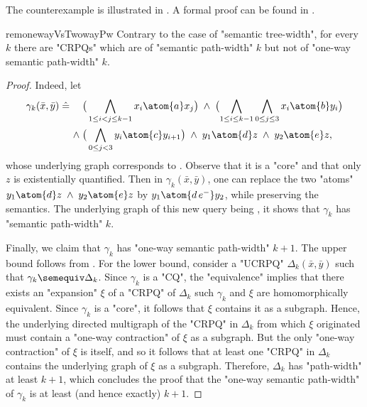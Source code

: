 The counterexample is illustrated in . A formal proof can be found
in .
\begin{restatable}{rem}{onewayVsTwowayPw}
	\AP\label{rk:path-width:oneway-vs-twoway}
	Contrary to the case of "semantic tree-width", for every $k$ there are "CRPQs" which are of "semantic path-width" $k$ but not of "one-way semantic path-width" $k$.
\end{restatable}
\begin{proof}
	Indeed, let
	\begin{align*}
		\gamma_k(\bar x, \bar y) \defeq\hspace{1em}
		\bigl( & \bigwedge_{1 \leq i < j \leq k-1} x_i \atom{a} x_j \bigr)
		\;\land\; \bigl(\bigwedge_{1 \leq i \leq k-1} \bigwedge_{0 \leq j \leq 3} x_i \atom{b} y_i \bigr) \\
		\land\; \bigl( & \bigwedge_{0 \leq j < 3} y_i \atom{c} y_{i+1}\bigr)
		\;\land\; y_1 \atom{d} z \;\land\; y_2 \atom{e} z,
	\end{align*}
	whose underlying graph corresponds to .
	Observe that it is a "core" and that only $z$ is existentially quantified.
	Then in $\gamma_k(\bar x, \bar y)$, one can replace the two "atoms"
	$y_1 \atom{d} z \;\land\; y_2 \atom{e} z$ by $y_1 \atom{d\, e^{-}} y_2$, while preserving the semantics. The underlying graph of this new query being , it shows that $\gamma_k$ has "semantic path-width" $k$.

	Finally, we claim that $\gamma_k$ has "one-way semantic path-width" $k+1$.
	The upper bound follows from .
	For the lower bound, consider a "UCRPQ" $\Delta_k(\bar x, \bar y)$ such that
	$\gamma_k \semequiv \Delta_k$. Since $\gamma_k$ is a "CQ", the "equivalence" implies
	that there exists an "expansion" $\xi$ of a "CRPQ" of $\Delta_k$ such $\gamma_k$ and
	$\xi$ are homomorphically equivalent. Since $\gamma_k$ is a "core", it follows that
	$\xi$ contains it as a subgraph. Hence, the underlying directed multigraph
	of the "CRPQ" in $\Delta_k$ from which $\xi$ originated
	must contain a "one-way contraction" of $\xi$ as a subgraph.
	But the only "one-way contraction" of $\xi$ is itself, and so it follows that
	at least one "CRPQ" in $\Delta_k$ contains the underlying graph of $\xi$ as a subgraph.
	Therefore, $\Delta_k$ has "path-width" at least $k+1$, which concludes the proof
	that the "one-way semantic path-width" of $\gamma_k$ is at least (and hence exactly) $k+1$.
\end{proof}

